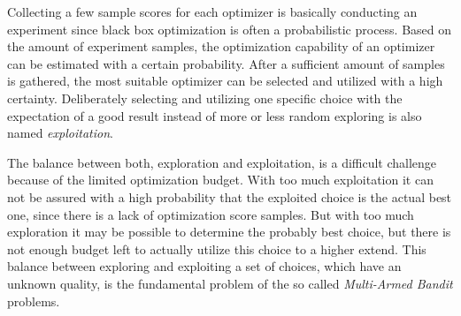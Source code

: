 Collecting a few sample scores for each optimizer is basically conducting an experiment since black box optimization is often a probabilistic process.
Based on the amount of experiment samples, the optimization capability of an optimizer can be estimated with a certain probability.
After a sufficient amount of samples is gathered, the most suitable optimizer can be selected and utilized with a high certainty.
Deliberately selecting and utilizing one specific choice with the expectation of a good result instead of more or less random exploring is also named \textit{exploitation}.

The balance between both, exploration and exploitation, is a difficult challenge because of the limited optimization budget.
With too much exploitation it can not be assured with a high probability that the exploited choice is the actual best one, since there is a lack of optimization score samples.
But with too much exploration it may be possible to determine the probably best choice, but there is not enough budget left to actually utilize this choice to a higher extend.
This balance between exploring and exploiting a set of choices, which have an unknown quality, is the fundamental problem of the so called \textit{Multi-Armed Bandit} problems.


